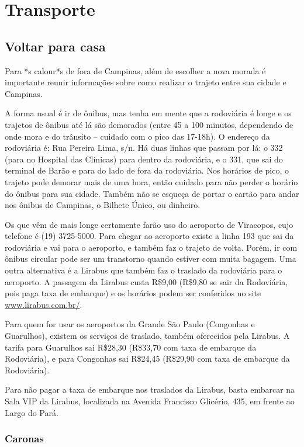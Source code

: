 
\section{Transporte}
\subsection{Voltar para casa}

Para *s calour*s de fora de Campinas, além de escolher a nova morada é
importante reunir informações sobre como realizar o trajeto entre sua cidade e
Campinas.

A forma usual é ir de ônibus, mas tenha em mente que a rodoviária é longe e os
trajetos de ônibus até lá são demorados (entre 45 a 100 minutos, dependendo de
onde mora e do trânsito -- cuidado com o pico das 17-18h). O endereço da
rodoviária é: Rua Pereira Lima, s/n. Há duas linhas que passam por lá: o 332
(para no Hospital das Clínicas) para dentro da rodoviária, e o 331, que sai do
terminal de Barão e para do lado de fora da rodoviária. Nos horários de pico, o
trajeto pode demorar mais de uma hora, então cuidado para não perder o horário
do ônibus para sua cidade. Também não se esqueça de portar o cartão para andar
nos ônibus de Campinas, o Bilhete Único, ou dinheiro.

Os que vêm de mais longe certamente farão uso do aeroporto de Viracopos, cujo
telefone é (19) 3725-5000. Para chegar ao aeroporto existe a linha 193 que sai
da rodoviária e vai para o aeroporto, e também faz o trajeto de volta. Porém,
ir com ônibus circular pode ser um transtorno quando estiver com muita bagagem.
Uma outra alternativa é a Lirabus que também faz o traslado da rodoviária para
o aeroporto. A passagem da Lirabus custa R\$9,00 (R\$9,80 se sair da
Rodoviária, pois paga taxa de embarque) e os horários podem ser conferidos no
site \url{www.lirabus.com.br/}.

Para quem for usar os aeroportos da Grande São Paulo (Congonhas e Guarulhos),
existem os serviços de traslado, também oferecidos pela Lirabus. A tarifa para
Guarulhos sai R\$28,30 (R\$33,70 com taxa de embarque da Rodoviária), e para
Congonhas sai R\$24,45 (R\$29,90 com taxa de embarque da Rodoviária).

Para não pagar a taxa de embarque nos traslados da Lirabus, basta embarcar na
Sala VIP da Lirabus, localizada na Avenida Francisco Glicério, 435, em frente
ao Largo do Pará.

\subsubsection{Caronas}

